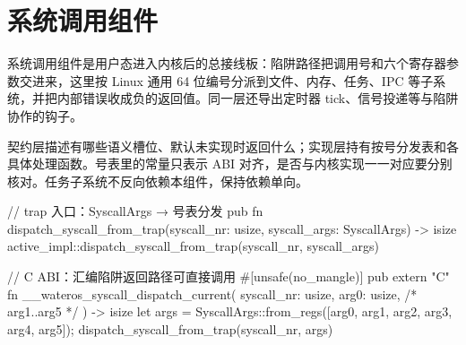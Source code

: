 
\section{系统调用组件}

系统调用组件是用户态进入内核后的总接线板：陷阱路径把调用号和六个寄存器参数交进来，这里按 Linux 通用 64 位编号分派到文件、内存、任务、IPC 等子系统，并把内部错误收成负的返回值。同一层还导出定时器 tick、信号投递等与陷阱协作的钩子。

契约层描述有哪些语义槽位、默认未实现时返回什么；实现层持有按号分发表和各具体处理函数。号表里的常量只表示 ABI 对齐，是否与内核实现一一对应要分别核对。任务子系统不反向依赖本组件，保持依赖单向。

\begin{rustcode}
// trap 入口：SyscallArgs → 号表分发
pub fn dispatch_syscall_from_trap(syscall_nr: usize, syscall_args: SyscallArgs) -> isize {
    active_impl::dispatch_syscall_from_trap(syscall_nr, syscall_args)
}

// C ABI：汇编陷阱返回路径可直接调用
#[unsafe(no_mangle)]
pub extern "C" fn __wateros_syscall_dispatch_current(
    syscall_nr: usize, arg0: usize, /* arg1..arg5 */
) -> isize {
    let args = SyscallArgs::from_regs([arg0, arg1, arg2, arg3, arg4, arg5]);
    dispatch_syscall_from_trap(syscall_nr, args)
}
\end{rustcode}
